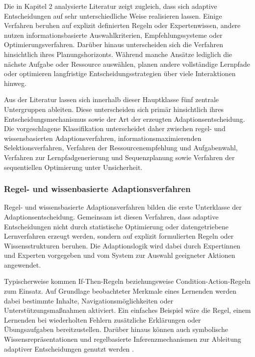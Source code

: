 Die in Kapitel 2 analysierte Literatur zeigt zugleich, dass sich
adaptive Entscheidungen auf sehr unterschiedliche Weise realisieren
lassen. Einige Verfahren beruhen auf explizit definierten Regeln oder
Expertenwissen, andere nutzen informationsbasierte Auswahlkriterien,
Empfehlungssysteme oder Optimierungsverfahren. Darüber hinaus
unterscheiden sich die Verfahren hinsichtlich ihres Planungshorizonts.
Während manche Ansätze lediglich die nächste Aufgabe oder Ressource
auswählen, planen andere vollständige Lernpfade oder optimieren
langfristige Entscheidungsstrategien über viele Interaktionen hinweg.

Aus der Literatur lassen sich innerhalb dieser Hauptklasse fünf zentrale
Untergruppen ableiten. Diese unterscheiden sich primär hinsichtlich
ihres Entscheidungsmechanismus sowie der Art der erzeugten
Adaptionsentscheidung. Die vorgeschlagene Klassifikation unterscheidet
daher zwischen regel- und wissensbasierten Adaptionsverfahren,
informationsmaximierenden Selektionsverfahren, Verfahren der
Ressourcenempfehlung und Aufgabenwahl, Verfahren zur Lernpfadgenerierung
und Sequenzplanung sowie Verfahren der sequentiellen Optimierung unter
Unsicherheit.

\subsubsection{Regel- und wissenbasierte
Adaptionsverfahren}\label{regel--und-wissenbasierte-adaptionsverfahren}

Regel- und wissensbasierte Adaptionsverfahren bilden die erste
Unterklasse der Adaptionsentscheidung. Gemeinsam ist diesen Verfahren,
dass adaptive Entscheidungen nicht durch statistische Optimierung oder
datengetriebene Lernverfahren erzeugt werden, sondern auf explizit
formulierten Regeln oder Wissensstrukturen beruhen. Die Adaptionslogik
wird dabei durch Expertinnen und Experten vorgegeben und vom System zur
Auswahl geeigneter Aktionen angewendet.

Typischerweise kommen If-Then-Regeln beziehungsweise
Condition-Action-Regeln zum Einsatz. Auf Grundlage beobachteter Merkmale
eines Lernenden werden dabei bestimmte Inhalte, Navigationsmöglichkeiten
oder Unterstützungsmaßnahmen aktiviert. Ein einfaches Beispiel wäre die
Regel, einem Lernenden bei wiederholten Fehlern zusätzliche Erklärungen
oder Übungsaufgaben bereitzustellen. Darüber hinaus können auch
symbolische Wissensrepräsentationen und regelbasierte
Inferenzmechanismen zur Ableitung adaptiver Entscheidungen genutzt
werden \citep{Wang2025}.


